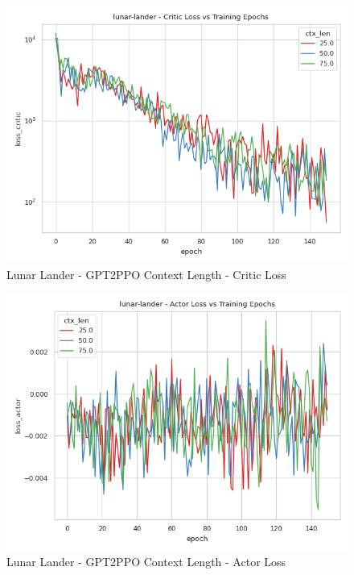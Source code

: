 \begin{figure}[htbp]
    \centerline{\includegraphics[width=\columnwidth]{./img/lunar-lander-loss_critic-ctx_len.png}}
    \caption{Lunar Lander - GPT2PPO Context Length - Critic Loss}
    \label{lunar-lander-loss_critic-ctx_len}
\end{figure}

\begin{figure}[htbp]
    \centerline{\includegraphics[width=\columnwidth]{./img/lunar-lander-loss_actor-ctx_len.png}}
    \caption{Lunar Lander - GPT2PPO Context Length - Actor Loss}
    \label{lunar-lander-loss_actor-ctx_len}
\end{figure}

